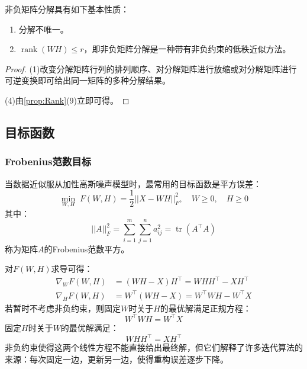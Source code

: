 \begin{property}\label{prop:NMF}
	非负矩阵分解具有如下基本性质：
	\begin{enumerate}
		\item 分解不唯一。
		\item $\operatorname{rank}(WH)\leqslant r$，即非负矩阵分解是一种带有非负约束的低秩近似方法。
	\end{enumerate}
\end{property}
\begin{proof}
	(1)改变分解矩阵行列的排列顺序、对分解矩阵进行放缩或对分解矩阵进行可逆变换即可给出同一矩阵的多种分解结果。\par
	(4)由\cref{prop:Rank}(9)立即可得。
\end{proof}

\subsection{目标函数}
\subsubsection{Frobenius范数目标}
当数据近似服从加性高斯噪声模型时，最常用的目标函数是平方误差：
\begin{equation*}
	\min_{W,H}\;F(W,H)=\frac{1}{2}||X-WH||_F^2,\quad W\geqslant0,\quad H\geqslant0
\end{equation*}
其中：
\begin{equation*}
	||A||_F^2=\sum_{i=1}^{m}\sum_{j=1}^{n}a_{ij}^2=\operatorname{tr}(A^{\top}A)
\end{equation*}
称为矩阵$A$的Frobenius范数平方。

\begin{derivation}
	对$F(W,H)$求导可得：
	\begin{align*}
		\nabla_WF(W,H)&=(WH-X)H^{\top}=WHH^{\top}-XH^{\top} \\
		\nabla_HF(W,H)&=W^{\top}(WH-X)=W^{\top}WH-W^{\top}X
	\end{align*}
	若暂时不考虑非负约束，则固定$W$时关于$H$的最优解满足正规方程：
	\begin{equation*}
		W^{\top}WH=W^{\top}X
	\end{equation*}
	固定$H$时关于$W$的最优解满足：
	\begin{equation*}
		WHH^{\top}=XH^{\top}
	\end{equation*}
	非负约束使得这两个线性方程不能直接给出最终解，但它们解释了许多迭代算法的来源：每次固定一边，更新另一边，使得重构误差逐步下降。
\end{derivation}

